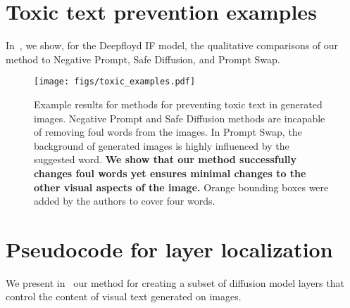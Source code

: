 \newpage
\section{Toxic text prevention examples}\label{app:toxic_examples}
In~, we show, for the Deepfloyd IF model, the qualitative comparisons of our method to Negative Prompt, Safe Diffusion, and Prompt Swap.

\begin{figure}[h]
    \centering
    \texttt{[image: figs/toxic\_examples.pdf]}
    \caption{Example results for methods for preventing toxic text in generated images. Negative Prompt and Safe Diffusion methods are incapable of removing foul words from the images. In Prompt Swap, the background of generated images is highly influenced by the suggested word. \textbf{We show that our method successfully changes foul words yet ensures minimal changes to the other visual aspects of the image.} Orange bounding boxes were added by the authors to cover four words.\label{fig:toxic_if_examples}}
\end{figure}


\newpage
\section{Pseudocode for layer localization}
We present in~ our method for creating a subset of diffusion model layers that control the content of visual text generated on images.

